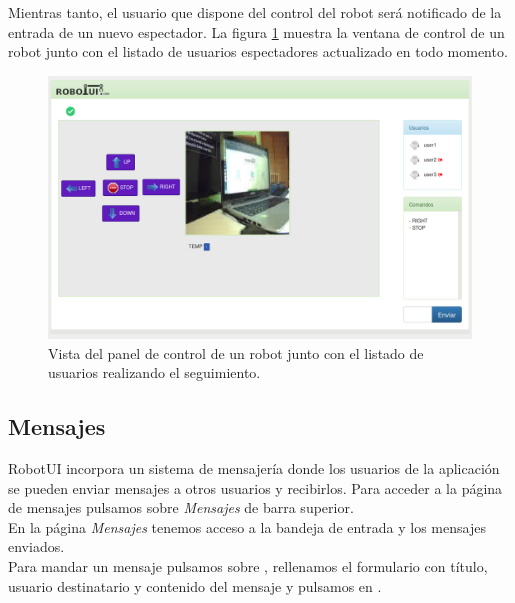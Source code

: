 Mientras tanto, el usuario que dispone del control del robot será notificado de la entrada de un nuevo espectador. La figura \ref{website:ventana-control} muestra la ventana de control de un robot junto con 
el listado de usuarios espectadores actualizado en todo momento.

\begin{figure}[H]
  \begin{center}
    \includegraphics[scale=.4]{imagenes/manual-usuario/vista_control.png}
  \end{center}
  \caption{ Vista del panel de control de un robot junto con el listado de usuarios realizando el seguimiento.}
  \label{website:ventana-control}
\end{figure}


\subsection{Mensajes}

RobotUI incorpora un sistema de mensajería donde los usuarios de la aplicación se pueden enviar mensajes a otros usuarios y recibirlos. Para acceder a la página de mensajes pulsamos sobre \emph{Mensajes} de barra superior.\\

En la página \emph{Mensajes} tenemos acceso a la bandeja de entrada y los mensajes enviados.\\

Para mandar un mensaje pulsamos sobre , rellenamos el formulario con título, usuario destinatario y contenido del mensaje y pulsamos en .

